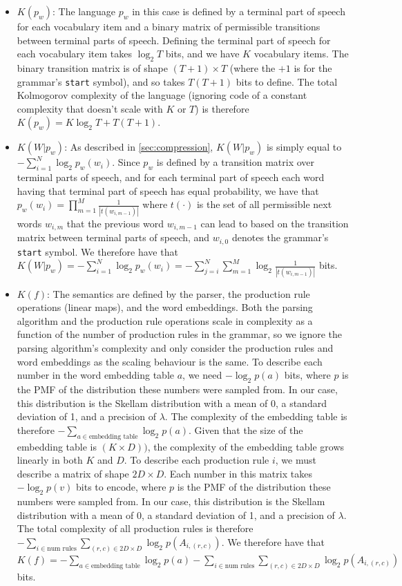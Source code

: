 \documentclass{article} %
\begin{document}
\begin{appendices}
\begin{itemize}
    \item $K(p_w)$: The language $p_w$ in this case is defined by a terminal part of speech for each vocabulary item and a binary matrix of permissible transitions between terminal parts of speech. Defining the terminal part of speech for each vocabulary item takes $\log_2 T$ bits, and we have $K$ vocabulary items. The binary transition matrix is of shape $(T+1) \times T$ (where the $+1$ is for the grammar's \texttt{start} symbol), and so takes $T(T+1)$ bits to define. The total Kolmogorov complexity of the language (ignoring code of a constant complexity that doesn't scale with $K$ or $T$) is therefore $K(p_w) = K\log_2 T + T(T+1)$.
    
    \item $K(W|p_w)$: As described in \cref{sec:compression}, $K(W|p_w)$ is simply equal to $-\sum_{i=1}^{N} \log_2 p_w(w_i)$. Since $p_w$ is defined by a transition matrix over terminal parts of speech, and for each terminal part of speech each word having that terminal part of speech has equal probability, we have that $p_w(w_i) = \prod_{m=1}^M \frac{1}{|t(w_{i,m-1})|}$ where $t(\cdot)$ is the set of all permissible next words $w_{i, m}$ that the previous word $w_{i, m-1}$ can lead to based on the transition matrix between terminal parts of speech, and $w_{i,0}$ denotes the grammar's \texttt{start} symbol. We therefore have that $K(W|p_w) = -\sum_{i=1}^N \log_2 p_w(w_i) = -\sum_{j=i}^N \sum_{m=1}^M \log_2 \frac{1}{|t(w_{i,m-1})|}$ bits.
    
    \item $K(f)$: The semantics are defined by the parser, the production rule operations (linear maps), and the word embeddings. Both the parsing algorithm and the production rule operations scale in complexity as a function of the number of production rules in the grammar, so we ignore the parsing algorithm's complexity and only consider the production rules and word embeddings as the scaling behaviour is the same. To describe each number in the word embedding table $a$, we need $-\log_2 p(a)$ bits, where $p$ is the PMF of the distribution these numbers were sampled from. In our case, this distribution is the Skellam distribution with a mean of 0, a standard deviation of 1, and a precision of $\lambda$. The complexity of the embedding table is therefore $-\sum_{a \in \text{embedding table}} \log_2 p(a)$. Given that the size of the embedding table is $(K \times D))$, the complexity of the embedding table grows linearly in both $K$ and $D$. To describe each production rule $i$, we must describe a matrix of shape $2D \times D$. Each number in this matrix takes $-\log_2 p(v)$ bits to encode, where $p$ is the PMF of the distribution these numbers were sampled from. In our case, this distribution is the Skellam distribution with a mean of 0, a standard deviation of 1, and a precision of $\lambda$. The total complexity of all production rules is therefore $-\sum_{i \in \text{num rules}} \sum_{(r, c) \in 2D \times D} \log_2 p(A_{i, (r,c)})$. We therefore have that $K(f) = -\sum_{a \in \text{embedding table}} \log_2 p(a) - \sum_{i \in \text{num rules}} \sum_{(r, c) \in 2D \times D} \log_2 p(A_{i, (r,c)})$ bits.
    

\end{itemize}
\end{appendices}
\end{document}
